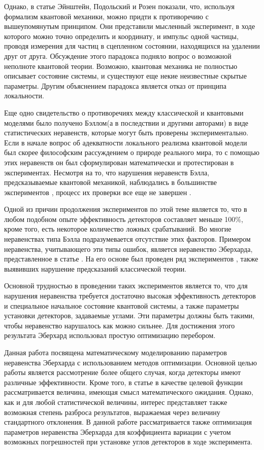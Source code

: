\documentclass[%
master,         %
subf,           %
href,           %
,times         %
]{disser}
\numberwithin{equation}{section}
\numberwithin{figure}{section}
\begin{document}
Однако, в статье \cite{EPR} Эйнштейн, Подольский и Розен показали, что, используя формализм квантовой механики, можно придти к противоречию с вышеупомянутым принципом. Они представили мысленный эксперимент, в ходе которого можно точно определить и координату, и импульс одной частицы, проводя измерения для частиц в сцепленном состоянии, находящихся на удалении друг от друга. Обсуждение этого парадокса подняло вопрос о возможной неполноте квантовой теории. Возможно, квантовая механика не полностью описывает состояние системы, и существуют еще некие неизвестные скрытые параметры. Другим объяснением парадокса является отказ от принципа локальности.

Еще одно свидетельство о противоречиях между классической и квантовыми моделями было получено Бэллом(а в последствии и другими авторами) в виде статистических неравенств, которые могут быть проверены экспериментально. Если в начале вопрос об адекватности локального реализма квантовой модели был скорее философским рассуждением о природе реального мира, то с помощью этих неравенств он был сформулирован математически и протестирован в экспериментах. Несмотря на то, что нарушения неравенств Бэлла, предсказываемые квантовой механикой, наблюдались в большинстве экспериментов \cite{ASP1}, процесс их проверки все еще не завершен \cite{Khrennikov_preprint}.

Одной из причин продолжения экспериментов по этой теме является то, что в любом подобном опыте эффективность детекторов составляет меньше 100\%, кроме того, есть некоторое количество ложных срабатываний. Во многие неравенствах типа Бэлла подразумевается отсутствие этих факторов. Примером неравенства, учитывающего эти типы ошибок, является неравенство Эберхарда, представленное в статье \cite{Eberhard}. На его основе был проведен ряд экспериментов \cite{Zeilinger}, также выявивших нарушение предсказаний классической теории.

Основной трудностью в проведении таких экспериментов является то, что для нарушения неравенства требуется достаточно высокая эффективность детекторов и специальное начальное состояние квантовой системы, а также параметры установки детекторов, задаваемые углами. Эти параметры должны быть такими, чтобы неравенство нарушалось как можно сильнее. Для достижения этого результата Эберхард использовал простую оптимизацию перебором.

Данная работа посвящена математическому моделированию параметров неравенства Эберхарда с использованием методов оптимизации. Основной целью работы является рассмотрение более общего случая, когда детекторы имеют различные эффективности. Кроме того, в статье \cite{Eberhard} в качестве целевой функции рассматривается величина, имеющая смысл математического ожидания. Однако, как и для любой статистической величины, интерес представляет также возможная степень разброса результатов, выражаемая через величину стандартного отклонения. В данной работе рассматривается также оптимизация параметров неравенства Эберхарда для коэффициента вариации с учетом возможных погрешностей при установке углов детекторов в ходе эксперимента.
\end{document}
